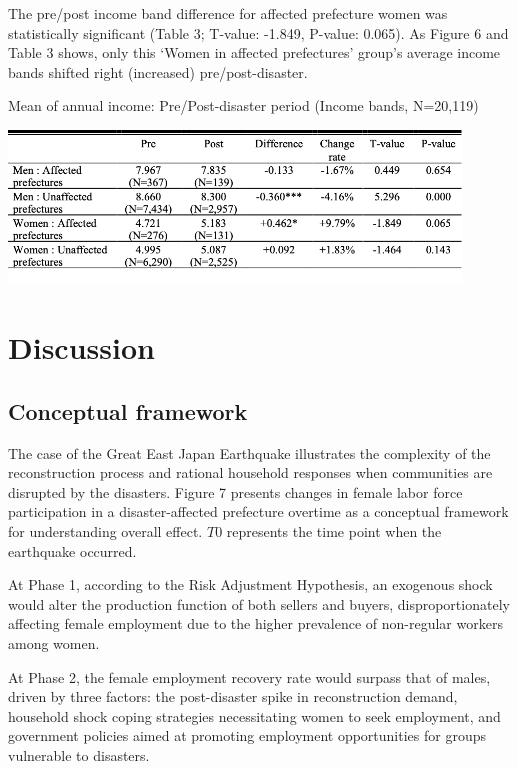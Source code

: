 \documentclass[12pt,halfline,a4paper]{ouparticle}
\begin{document}
\newpage

The pre/post income band difference for affected prefecture women was statistically significant (Table 3; T-value: -1.849, P-value: 0.065). As Figure 6 and Table 3 shows, only this ‘Women in affected prefectures’ group's average income bands shifted right (increased) pre/post-disaster.


\begin{table}[h!]
    \centering
    \caption{Mean of annual income: Pre/Post-disaster period (Income bands, N=20,119)}
    \label{tab:annual_income}
    \includegraphics[width=0.9\textwidth]{Annual income table.png}  %
\end{table}

\newpage

\section{Discussion}
\label{sec5}

\subsection{Conceptual framework}
\label{sec5.1}

The case of the Great East Japan Earthquake illustrates the complexity of the reconstruction process and rational household responses when communities are disrupted by the disasters. Figure 7 presents changes in female labor force participation in a disaster-affected prefecture overtime as a conceptual framework for understanding overall effect. $T0$ represents the time point when the earthquake occurred. 

At Phase 1, according to the Risk Adjustment Hypothesis, an exogenous shock would alter the production function of both sellers and buyers, disproportionately affecting female employment due to the higher prevalence of non-regular workers among women.

At Phase 2, the female employment recovery rate would surpass that of males, driven by three factors: the post-disaster spike in reconstruction demand, household shock coping strategies necessitating women to seek employment, and government policies aimed at promoting employment opportunities for groups vulnerable to disasters.
\end{document}
